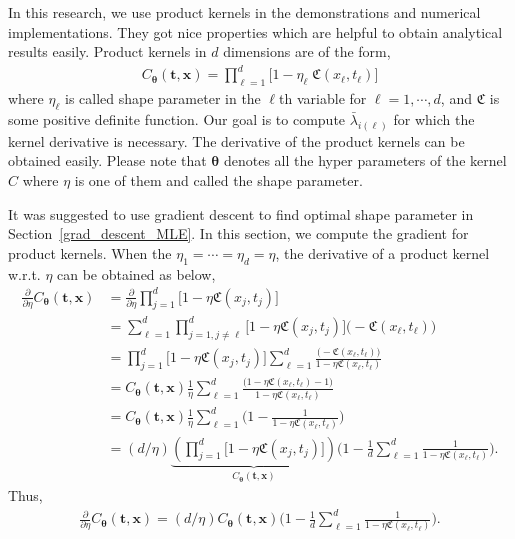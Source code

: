 \documentclass{iitthesis}          %
\newcommand{\bm}[1]{\boldsymbol{#1}}
\newcommand{\vtheta}{{\bm{\theta}}}
\newcommand{\vt}{\bm{t}}
\newcommand{\vx}{\bm{x}}
\newcommand\secref{Section~\ref}
\begin{document}
\label{sec:product_kernel}

In this research, we use product kernels in the demonstrations and numerical implementations. They got nice properties which are helpful to obtain analytical results easily. Product kernels in $d$ dimensions are of the form,
\begin{align}
\label{eqn:prod_kernel}
C_\vtheta(\vt, \vx) = 
\prod_{\ell=1}^d \biggl[ 1 - \eta_\ell \; \mathfrak{C}(x_\ell,t_\ell) \biggr]
\end{align}
where $\eta_\ell$ is called shape parameter in the $\ell$th variable for $\ell=1,\cdots,d$, and $\mathfrak{C}$ is some positive definite function. Our goal is to compute $\bar{\lambda}_{i(\ell)}$ for which the kernel derivative is necessary. The derivative of the product kernels can be obtained easily. Please note that $\vtheta$ denotes all the hyper parameters of the kernel $C$ where $\eta$ is one of them and called the shape parameter.

\label{sec:deriv_of_kernel}
It was suggested to use gradient descent to find optimal shape parameter in \secref{grad_descent_MLE}. In this section, we compute the gradient for product kernels. When the $\eta_1=\cdots=\eta_d=\eta$, the derivative of a product kernel  w.r.t. $\eta$ can be obtained as below,
\begin{align*}
\frac{\partial}{\partial \eta} C_\vtheta(\vt, \vx) 
& =
\frac{\partial}{\partial \eta} 
\prod_{j=1}^d \biggl[
1 - \eta \mathfrak{C}(x_j,t_j) \biggr] %
\\
& = 
\sum_{\ell=1}^d  
\prod_{j=1, j \neq \ell}^d \biggl[
1 - \eta \mathfrak{C}(x_j,t_j) \biggr]
\biggl( - \mathfrak{C}(x_\ell,t_\ell) \biggr)
\\
& =
\prod_{j=1}^d \biggl[
1 - \eta \mathfrak{C}(x_j,t_j) \biggr]
\sum_{\ell=1}^d 
\frac{
	\biggl( - \mathfrak{C}(x_\ell,t_\ell) \biggr)
}{
	1 - \eta \mathfrak{C}(x_\ell,t_\ell) 
}
\\
& =
C_\vtheta(\vt, \vx) 
\frac{1}{\eta}
\sum_{\ell=1}^d 
\frac{
	\biggl(1 - \eta \mathfrak{C}({x_\ell,t_\ell})  - 1 \biggr)
}{
	1 - \eta \mathfrak{C}(x_\ell,t_\ell) 
}
\\
& =
C_\vtheta(\vt, \vx) 
\frac{1}{\eta}
\sum_{\ell=1}^d 
\biggl(
1 - 
\frac{1
}{
	1 - \eta \mathfrak{C}(x_\ell,t_\ell) 
}
\biggr)
\\
& =
({d}/{\eta} )
\underbrace{
	\left(
	\prod_{j=1}^d \biggl[
	1 - \eta \mathfrak{C}(x_j,t_j) \biggr]
	\right) }_
{ C_\vtheta(\vt, \vx) }
\biggl(
1 - 
\frac{1}{d} \sum_{\ell=1}^d
\frac{1}
{ 1 - \eta \mathfrak{C}(x_\ell,t_\ell) }
\biggr)
.
\end{align*}
Thus,
\begin{align*}
\frac{\partial}{\partial \eta} C_\vtheta(\vt, \vx) = ({d}/{\eta} ) C_\vtheta(\vt, \vx) 
\biggl(
1 - 
\frac{1}{d} \sum_{\ell=1}^d
\frac{1}
{ 1 - \eta \mathfrak{C}(x_\ell,t_\ell) }
\biggr).
\end{align*}
\end{document}
